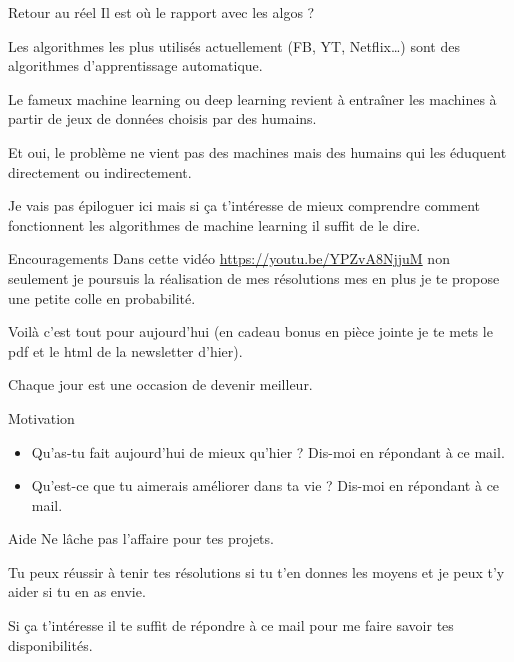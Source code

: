 \documentclass[presentation]{beamer}
\begin{document}
\begin{frame}[label={sec:orgf743a49}]{Retour au réel}
Il est où le rapport avec les algos ?


Les algorithmes les plus utilisés actuellement (FB, YT, Netflix\ldots{})
sont des algorithmes d'apprentissage automatique.


Le fameux machine learning ou deep learning revient à entraîner les
machines à partir de jeux de données choisis par des humains. 


Et oui, le problème ne vient pas des machines mais des humains qui
les éduquent directement ou indirectement.


Je vais pas épiloguer ici mais si ça t'intéresse de mieux
comprendre comment fonctionnent les algorithmes de machine learning
il suffit de le dire.
\end{frame}

\begin{frame}[label={sec:orga6db3c1}]{Encouragements}
Dans cette vidéo \url{https://youtu.be/YPZvA8NjjuM} non seulement je
poursuis la réalisation de mes résolutions mes en plus je te
propose une petite colle en probabilité.


Voilà c'est tout pour aujourd'hui (en cadeau bonus en pièce jointe
je te mets le pdf et le html de la newsletter d'hier). 


Chaque jour est une occasion de devenir meilleur.
\end{frame}


\begin{frame}[label={sec:org9ba8989}]{Motivation}
\begin{itemize}
\item Qu'as-tu fait aujourd'hui de mieux qu'hier ? 
Dis-moi en répondant à ce mail.

\item Qu'est-ce que tu aimerais améliorer dans ta vie ? 
Dis-moi en répondant à ce mail.
\end{itemize}
\end{frame}


\begin{frame}[label={sec:org8cb42f1}]{Aide}
Ne lâche pas l'affaire pour tes projets. 


Tu peux réussir à tenir tes résolutions si tu t'en donnes les
moyens et je peux t'y aider si tu en as envie. 


Si ça t'intéresse il te suffit de répondre à ce mail pour me faire
savoir tes disponibilités. 
\end{frame}
\end{document}
